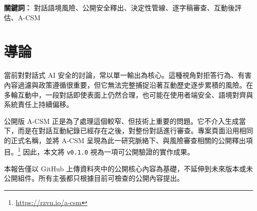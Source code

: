 \documentclass[11pt,a4paper]{article}
\begin{document}
\begin{abstract}
A-CSM 的正式全名為 \textit{AI Contextual Signal Matrix}。已釋出的公開核心是一套具決定性的 Node.js 管線，用於在對話互動完成之後，對對話語境風險進行審查。它的功能比即時內容管制更聚焦，主要用於可重現的基線驗證、釋出審查、紅隊測試支援，以及互動後的技術檢查。

本報告僅記錄公開核心版本，也就是 \texttt{v0.1.0}。本文範圍只限於 GitHub 上傳資料夾內實際存在的內容，包括輸入格式、各處理階段、已釋出的設定介面、輸出契約、驗證路徑，以及目前的公開邊界。未公開或受限制的組件，不在本文討論範圍內。

目前公開核心支援結構化 \texttt{turns} 輸入、頂層 \texttt{text} 快捷輸入，以及 Markdown 逐字稿輸入。系統會經過一條已釋出的八階段協調流程，涵蓋去識別化、事件偵測、VCD 推論、重複訊號登錄、TAG 升級判定、\texttt{PS/SUB/F/E} 推導、schema 驗證與 release gate 評估。以 2026-03-18 的驗證套件為基準，本地測試結果為 \texttt{921} 項通過、\texttt{0} 項失敗；已釋出的 baseline run 則記錄 \texttt{accuracy = 1.0}、\texttt{false\_positive\_rate = 0}、\texttt{false\_negative\_rate = 0}，對應於目前公開的 risk-status 基線切片。

本報告有四個目的。第一，交代 A-CSM 的正式名稱、範圍與公開邊界。第二，說明公開核心如何運作以及應如何執行。第三，界定目前驗證結果實際能證明與不能證明的範圍。第四，在不超出已釋出內容的前提下，說明 A-CSM 與 CXC-7、CXOD-7、USCH 以及 Moore et al. 經驗證據之間的關係。
\end{abstract}

\noindent\textbf{關鍵詞：} 對話語境風險、公開安全釋出、決定性管線、逐字稿審查、互動後評估、A-CSM

\tableofcontents
\newpage

\section{導論}

當前對對話式 AI 安全的討論，常以單一輸出為核心。這種視角對拒答行為、有害內容過濾與政策遵循很重要，但它無法完整捕捉沿著互動歷史逐步累積的風險。在多輪互動中，一段對話即使表面上仍然合理，也可能在使用者端安全、語境對齊與系統責任上持續偏移。

公開版 A-CSM 正是為了處理這個較窄、但技術上重要的問題。它不介入生成當下，而是在對話互動紀錄已經存在之後，對整份對話進行審查。專案頁面沿用相同的正式名稱，並將 A-CSM 呈現為此一研究脈絡下、與風險審查相關的公開釋出項目。\footnote{\url{https://rzvn.io/a-csm}} 因此，本文將 \texttt{v0.1.0} 視為一項可公開驗證的實作成果。

本報告僅以 GitHub 上傳資料夾中的公開核心內容為基礎，不延伸到未來版本或未公開組件。所有主張都只根據目前可檢查的公開內容提出。
\end{document}
